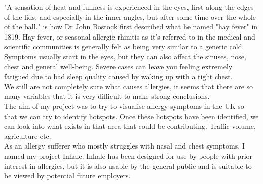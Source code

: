 "A sensation of heat and fullness is experienced in the eyes, first along the edges of the lids, and especially in the inner angles, but after some time over the whole of the ball." is how Dr John Bostock first described what he named "hay fever" in 1819. Hay fever, or seasonal allergic rhinitis as it's referred to in the medical and scientific communities is generally felt as being very similar to a generic cold. Symptoms usually start in the eyes, but they can also affect the sinuses, nose, chest and general well-being. Severe cases can leave you feeling extremely fatigued due to bad sleep quality caused by waking up with a tight chest.\\

We still are not completely sure what causes allergies, it seems that there are so many variables that it is very difficult to make strong conclusions.\\

The aim of my project was to try to visualise allergy symptoms in the UK so that we can try to identify hotspots. Once these hotspots have been identified, we can look into what exists in that area that could be contributing. Traffic volume, agriculture etc.\\

As an allergy sufferer who mostly struggles with nasal and chest symptoms, I named my project Inhale. Inhale has been designed for use by people with prior interest in allergies, but it is also usable by the general public and is suitable to be viewed by potential future employers.